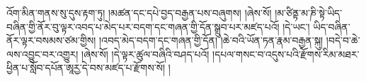 འོག་མིན་གནས་སུ་དུས་རྟག་ཏུ། །མཚན་དང་དཔེ་བྱད་བརྒྱན་པས་བཞུགས། །ཞེས་སོ། །མ་ཙིནྟ་མ་ཎི་སྟེ་ཡིད་བཞིན་གྱི་ནོར་བུ་ལྟར་འབད་པ་མེད་པར་བདག་དང་གཞན་གྱི་དོན་སྒྲུབ་པར་མཛད་པའོ། །དེ་ཡང་། ཡིད་བཞིན་ནོར་ལྟར་བསམས་ཙམ་གྱིས། །འབད་མེད་བདག་དང་གཞན་གྱི་དོན། །ཆེ་བའི་ཡོན་ཏན་རྣམ་བརྒྱན་སྐུ། །བདེ་བ་ཆེ་ལས་འབྱུང་བར་འགྱུར། །ཞེས་སོ། །དེ་ལྟར་ཚུལ་བཞིའི་བཤད་པའོ། །དཔལ་གསང་བ་འདུས་པའི་རྫོགས་རིམ་མཐར་ཕྱིན་པ་སློབ་དཔོན་ཨཱརྱ་དེ་བས་མཛད་པ་རྫོགས་སོ། ། 